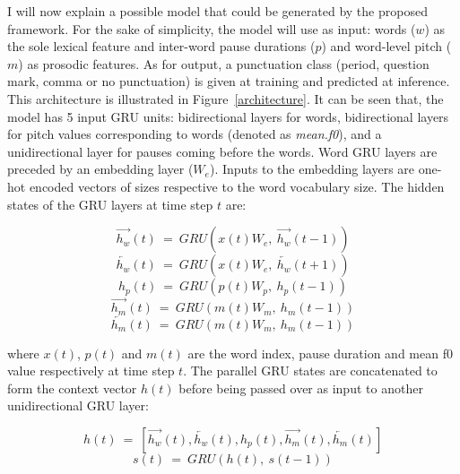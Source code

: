I will now explain a possible model that could be generated by the proposed framework. For the sake of simplicity, the model will use as input: words ($w$) as the sole lexical feature and inter-word pause durations ($p$) and word-level pitch ($m$) as prosodic features. As for output, a punctuation class (period, question mark, comma or no punctuation) is given at training and predicted at inference. This architecture is illustrated in Figure~\ref{architecture}. It can be seen that, the model has 5 input GRU units: bidirectional layers for words, bidirectional layers for pitch values corresponding to words (denoted as \textit{mean.f0}), and a unidirectional layer for pauses coming before the words. Word GRU layers are preceded by an embedding layer ($W_{e}$). Inputs to the embedding layers are one-hot encoded vectors of sizes respective to the word vocabulary size. The hidden states of the GRU layers at time step $t$ are:

\begin{equation}
\overrightarrow{h_{w}}(t)~=~GRU(x(t)W_{e},~\overrightarrow{h_{w}}(t-1)) 
\end{equation}
\begin{equation}
\overleftarrow{h_{w}}(t)~=~GRU(x(t)W_{e},~\overleftarrow{h_{w}}(t+1)) \end{equation}
\begin{equation}
h_{p}(t)~=~GRU(p(t)W_{p},~h_{p}(t-1))
\end{equation}
\begin{equation}
\overrightarrow{h_{m}}(t)~=~GRU(m(t)W_{m},~h_{m}(t-1))
\end{equation}
\begin{equation}
\overleftarrow{h_{m}}(t)~=~GRU(m(t)W_{m},~h_{m}(t-1))
\end{equation}

\noindent where $x(t)$, $p(t)$ and $m(t)$ are the word index, pause duration and mean f0 value respectively at time step $t$. %
The parallel GRU states are concatenated to form the context vector $h(t)$ before being passed over as input to another unidirectional GRU layer:

\begin{equation}
h(t)~=~\left[ \overrightarrow{h_{w}}(t), \overleftarrow{h_{w}}(t), h_{p}(t), \overrightarrow{h_{m}}(t), \overleftarrow{h_{m}}(t) \right] 
\end{equation}
\begin{equation}
s(t)~=~GRU(h(t),~s(t-1)) 
\end{equation}

